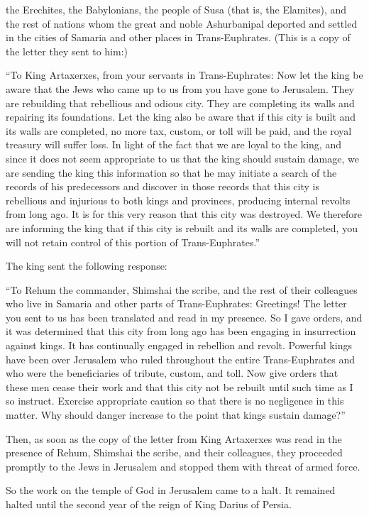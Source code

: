 {the Erechites,
the Babylonians,
the people
of Susa
(that
is, the Elamites),
and the rest
of nations
whom
the great
and noble
Ashurbanipal
deported
and settled
in the cities
of Samaria
and other places
in Trans-Euphrates.
(This
is a copy
of the letter
they sent
to
him:)
\par }{\PP “To
King
Artaxerxes,
from your servants
in Trans-Euphrates:
Now let the king
be
aware
that
the Jews
who
came up
to us from
you
have gone
to
Jerusalem.
They are rebuilding that rebellious
and odious
city.
They are completing
its walls
and repairing
its foundations.
Let
the king
also be
aware
that
if
this
city
is built
and its walls
are completed,
no more
tax,
custom,
or toll
will be paid,
and the royal
treasury
will suffer loss.
In light of
the fact
that
we are loyal
to the king,
and since it does
not
seem
appropriate
to
us that the king
should sustain
damage,
we are sending
the king
this
information
so that
he may initiate a search
of the records
of his predecessors
and discover
in those records
that
this
city
is rebellious
and injurious
to both kings
and provinces,
producing
internal
revolts
from
long
ago.
It is for
this
very reason that this
city
was destroyed.
We
therefore are informing
the king
that
if
this
city
is rebuilt
and its walls
are completed,
you will
not
retain control of this
portion
of Trans-Euphrates.”
\par }{\PP {}The king
sent
the following response:
\par }{\PP “To
Rehum
the commander,
Shimshai
the scribe,
and the rest of
their colleagues
who
live in
Samaria
and other parts
of Trans-Euphrates: Greetings!
The letter
you sent
to
us has been translated
and read
in my presence.
So
I gave
orders,
and it was determined
that
this
city
from
long
ago
has been engaging in insurrection
against
kings.
It has continually engaged in
rebellion
and revolt.
Powerful
kings
have been
over
Jerusalem
who ruled
throughout the entire
Trans-Euphrates
and who were the beneficiaries
of tribute,
custom,
and toll.
Now
give
orders
that these
men
cease
their work and that this
city
not
be rebuilt
until
such time as I so instruct.
Exercise appropriate caution
so that there is
no negligence
in
this
matter. Why
should danger
increase
to the point that kings
sustain damage?”
\par }{\PP {}Then,
as soon as
the copy
of the letter
from
King
Artaxerxes
was read
in the presence
of Rehum,
Shimshai
the scribe,
and their colleagues,
they proceeded
promptly
to
the Jews
in Jerusalem
and stopped
them
with threat
of armed force.
\par }{\PP {}So
the work
on the temple
of God
in Jerusalem
came to a halt.
It remained
halted
until
the second
year
of the reign
of King
Darius
of Persia.

}
